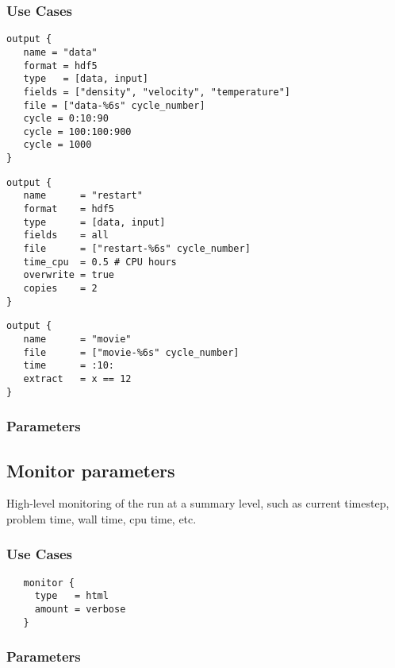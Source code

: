 \subsubsection{Use Cases}


\begin{verbatim}
output { 
   name = "data"
   format = hdf5
   type   = [data, input]
   fields = ["density", "velocity", "temperature"]
   file = ["data-%6s" cycle_number]
   cycle = 0:10:90
   cycle = 100:100:900
   cycle = 1000
}
\end{verbatim}

\begin{verbatim}
output { 
   name      = "restart"
   format    = hdf5
   type      = [data, input]
   fields    = all
   file      = ["restart-%6s" cycle_number]
   time_cpu  = 0.5 # CPU hours
   overwrite = true
   copies    = 2
}
\end{verbatim}

\begin{verbatim}
output { 
   name      = "movie"
   file      = ["movie-%6s" cycle_number]
   time      = :10:
   extract   = x == 12
}
\end{verbatim}


\subsubsection{Parameters}


\subsection{Monitor parameters} \label{ss:params-monitor}

High-level monitoring of the run at a summary level, such as current
timestep, problem time, wall time, cpu time, etc.


\subsubsection{Use Cases}

\begin{verbatim}
   monitor {
     type   = html
     amount = verbose
   }
\end{verbatim}

\subsubsection{Parameters}


